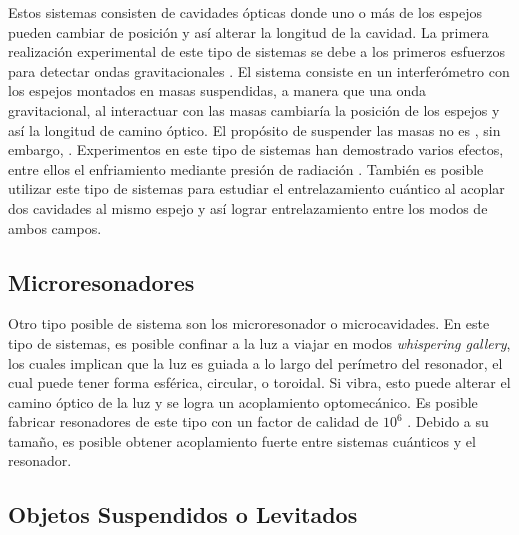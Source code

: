 \documentclass[10pt,a4paper]{report}
\begin{document}
Estos sistemas consisten de cavidades ópticas donde uno o más de los
espejos pueden cambiar de posición y así alterar la longitud de la
cavidad. La primera realización experimental de este tipo de sistemas
se debe a los primeros esfuerzos para detectar ondas gravitacionales
\cite{AbramoviciLIGO}. El sistema consiste en un interferómetro con
los espejos montados en masas suspendidas, a manera que una onda
gravitacional, al interactuar con las masas cambiaría la posición de
los espejos y así la longitud de camino óptico. El propósito de
suspender las masas no es , sin embargo, .
Experimentos en este tipo de sistemas han demostrado varios efectos,
entre ellos el enfriamiento mediante presión de radiación
\cite{CorbittOC}. También es posible utilizar este tipo de sistemas
para estudiar el entrelazamiento cuántico\cite{ChenED} al acoplar dos
cavidades al mismo espejo y así lograr entrelazamiento entre los modos
de ambos campos.

\subsection{Microresonadores}

Otro tipo posible de sistema  son los
microresonador o microcavidades. En este tipo de sistemas, es posible
confinar a la luz a viajar en modos \textit{whispering gallery}, los
cuales implican que la luz es guiada a lo largo del perímetro del
resonador, el cual puede tener forma esférica, circular, o
toroidal\cite{VahalaOM}. Si  vibra, esto puede alterar el camino óptico de la luz y
se logra un acoplamiento  optomecánico. Es posible fabricar resonadores de este
tipo con un factor de calidad de $10^6$  \cite{EuroSensors2017}. Debido a su tamaño, es
posible obtener acoplamiento fuerte entre sistemas cuánticos y el
resonador\cite{VerhagenMOC}.

\subsection{Objetos Suspendidos o Levitados}
\end{document}
